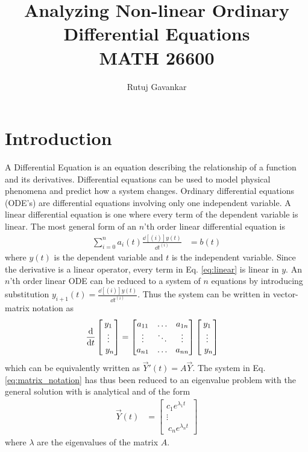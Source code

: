 \documentclass[11pt,1in]{article}
\title{Analyzing Non-linear Ordinary Differential Equations\\ {\small MATH 26600}}
\author{Rutuj Gavankar}
\date{}
\begin{document}
\maketitle

\section{Introduction}
A Differential Equation is an equation describing the relationship of a function and its derivatives. Differential equations can be used to model physical phenomena and predict how a system changes. Ordinary differential equations (ODE's) are differential equations involving only one independent variable. A linear differential equation is one where every term of the dependent  variable is linear. The most general form of an $n$'th order linear differential equation is 
\begin{align}
\sum_{i = 0}^{n} a_i(t) \frac{\dd[(i)]{y(t)}}{\dd{t^{(i)}}} &= b(t) \label{eq:linear}
\end{align}
where $y(t)$ is the dependent variable and $t$ is the independent variable. Since the derivative is a linear operator, every term in Eq. \ref{eq:linear} is linear in $y$. An $n$'th order linear ODE can be reduced to a system of $n$ equations by introducing substitution $y_{i+1}(t) = \frac{\dd[(i)]{y(t)}}{\dd{t^{(i)}}}$. Thus the system can be written in vector-matrix notation as 
\begin{align}
\derivative{}{t} \begin{bmatrix}
y_1 \\ \vdots  \\\ y_n 
\end{bmatrix}  &= 
\begin{bmatrix}
a_{11} & \ldots & a_{1n} \\
\vdots & \ddots & \vdots \\
a_{n1} & \ldots & a_{nn}
\end{bmatrix}
\begin{bmatrix}
y_1 \\ \vdots  \\\ y_n \label{eq:matrix_notation}
\end{bmatrix}
\end{align}
which can be equivalently written as $\vec{Y}'(t) = A \vec{Y}$. The system in Eq. \ref{eq:matrix_notation} has thus been reduced to an eigenvalue problem with the general solution with is analytical and of the form 
\begin{align}
\vec{Y}(t) &= \begin{bmatrix}
c_1 e^{\lambda_1 t} \\ \vdots  \\\ c_n e^{\lambda_n t}  \label{eq:general_sol}
\end{bmatrix}
\end{align}
where $\lambda$ are the eigenvalues of the matrix $A$. 
\end{document}
